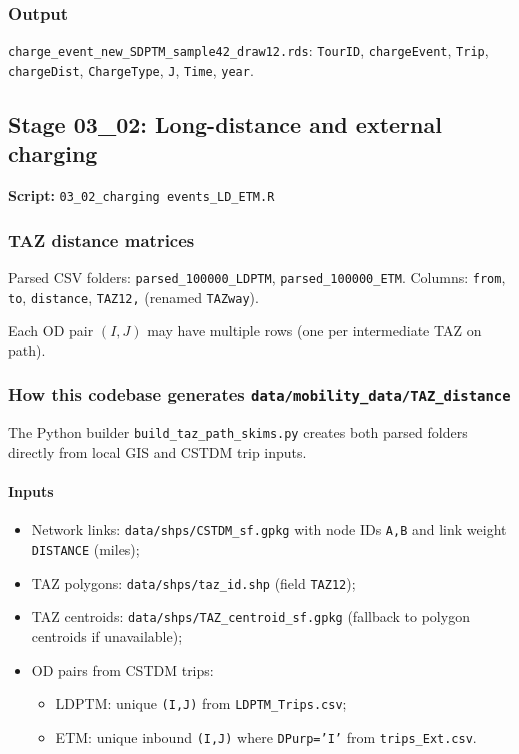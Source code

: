 \documentclass[11pt,a4paper]{article}
\begin{document}
\subsubsection{Output}
\texttt{charge\_event\_new\_SDPTM\_sample42\_draw12.rds}: \texttt{TourID}, \texttt{chargeEvent}, \texttt{Trip}, \texttt{chargeDist}, \texttt{ChargeType}, \texttt{J}, \texttt{Time}, \texttt{year}.

\subsection{Stage 03\_02: Long-distance and external charging}
\textbf{Script:} \texttt{03\_02\_charging events\_LD\_ETM.R}

\subsubsection{TAZ distance matrices}
Parsed CSV folders: \texttt{parsed\_100000\_LDPTM}, \texttt{parsed\_100000\_ETM}. Columns: \texttt{from}, \texttt{to}, \texttt{distance}, \texttt{TAZ12,} (renamed \texttt{TAZway}).

Each OD pair $(I,J)$ may have multiple rows (one per intermediate TAZ on path).

\subsubsection{How this codebase generates \texttt{data/mobility\_data/TAZ\_distance}}
The Python builder \texttt{build\_taz\_path\_skims.py} creates both parsed folders directly from local GIS and CSTDM trip inputs.

\paragraph{Inputs}
\begin{itemize}[noitemsep]
  \item Network links: \texttt{data/shps/CSTDM\_sf.gpkg} with node IDs \texttt{A,B} and link weight \texttt{DISTANCE} (miles);
  \item TAZ polygons: \texttt{data/shps/taz\_id.shp} (field \texttt{TAZ12});
  \item TAZ centroids: \texttt{data/shps/TAZ\_centroid\_sf.gpkg} (fallback to polygon centroids if unavailable);
  \item OD pairs from CSTDM trips:
  \begin{itemize}[noitemsep]
    \item LDPTM: unique \texttt{(I,J)} from \texttt{LDPTM\_Trips.csv};
    \item ETM: unique inbound \texttt{(I,J)} where \texttt{DPurp='I'} from \texttt{trips\_Ext.csv}.
  \end{itemize}
\end{itemize}
\end{document}
